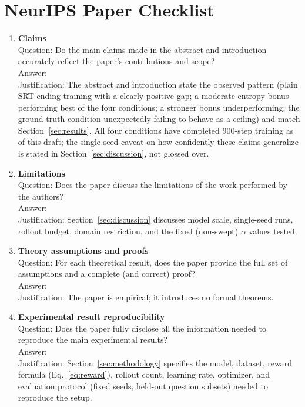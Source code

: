 \documentclass{article}
\begin{document}
\newpage
\appendix
\section*{NeurIPS Paper Checklist}

\begin{enumerate}

\item \textbf{Claims}\\
    Question: Do the main claims made in the abstract and introduction
    accurately reflect the paper's contributions and scope?\\
    Answer: \answerYes{}\\
    Justification: The abstract and introduction state the observed pattern
    (plain SRT ending training with a clearly positive gap; a moderate
    entropy bonus performing best of the four conditions; a stronger bonus
    underperforming; the ground-truth condition unexpectedly failing to behave as a ceiling)
    and match Section~\ref{sec:results}. All
    four conditions have completed 900-step training as of this draft; the
    single-seed caveat on how confidently these claims generalize is stated
    in Section~\ref{sec:discussion}, not glossed over.

\item \textbf{Limitations}\\
    Question: Does the paper discuss the limitations of the work performed
    by the authors?\\
    Answer: \answerYes{}\\
    Justification: Section~\ref{sec:discussion} discusses model scale, single-seed
    runs, rollout budget, domain restriction, and the fixed (non-swept)
    $\alpha$ values tested.

\item \textbf{Theory assumptions and proofs}\\
    Question: For each theoretical result, does the paper provide the full
    set of assumptions and a complete (and correct) proof?\\
    Answer: \answerNA{}\\
    Justification: The paper is empirical; it introduces no formal
    theorems.

\item \textbf{Experimental result reproducibility}\\
    Question: Does the paper fully disclose all the information needed to
    reproduce the main experimental results?\\
    Answer: \answerYes{}\\
    Justification: Section~\ref{sec:methodology} specifies the model,
    dataset, reward formula (Eq.~\ref{eq:reward}), rollout count, learning
    rate, optimizer, and evaluation protocol (fixed seeds, held-out
    question subsets) needed to reproduce the setup.


\end{enumerate}
\end{document}
